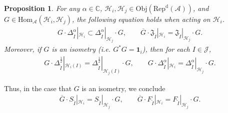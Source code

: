 \documentclass[12pt,a4paper]{article}
\theoremstyle{definition}
\theoremstyle{plain}
\newtheorem{pp}[df]{Proposition}
\newcommand{\fk}{\mathfrak}
\newcommand{\mc}{\mathcal}
\newcommand{\wtd}{\widetilde}
\newcommand{\ovl}{\overline}
\newcommand{\id}{\mathbf{1}}
\newcommand{\Hom}{\mathrm{Hom}}
\newcommand{\RepdA}{\mathrm{Rep}^{\mathrm d}(\mc A)}
\newcommand{\mbb}{\mathbb}
\newcommand{\Obj}{\mathrm{Obj}}
\numberwithin{equation}{section}
\begin{document}
\begin{pp}\label{lb14}
For any $\alpha\in\mbb C$, $\mc H_i,\mc H_j\in\Obj(\RepdA)$,	and  $G\in\Hom_{\mc A}(\mc H_i,\mc H_j)$, the following equation holds when acting on $\mc H_i$.
\begin{gather}
G\cdot \Delta_{\wtd I}^\alpha|_{\mc H_i}\subset \Delta_{\wtd I}^\alpha|_{\mc H_j}\cdot G,\qquad  \ovl G\cdot\fk J_{\wtd I}|_{\mc H_i}=\fk J_{\wtd I}|_{\mc H_j}\cdot G.\label{eq60}
\end{gather}
Moreover, if $G$ is an isometry (i.e. $G^*G=\id_i$), then for each $I\in\mc J$,
\begin{align}
G\cdot \Delta_{\wtd I}^{\frac 12}|_{\mc H_i(I)}=\Delta_{\wtd I}^{\frac 12}|_{\mc H_j(I)}\cdot G,\qquad G\cdot \Delta_{\wtd I}^\alpha|_{\mc H_i}=\Delta_{\wtd I}^\alpha|_{\mc H_j}\cdot G.\label{eq61}
\end{align}
\end{pp}

Thus, in the case that $G$ is an isometry, we conclude
\begin{align}
\ovl G\cdot S_{\wtd I}|_{\mc H_i}=S_{\wtd I}|_{\mc H_j}\cdot G,\qquad 	\ovl G\cdot F_{\wtd I}|_{\mc H_i}=F_{\wtd I}|_{\mc H_j}\cdot G.
\end{align}
\end{document}
